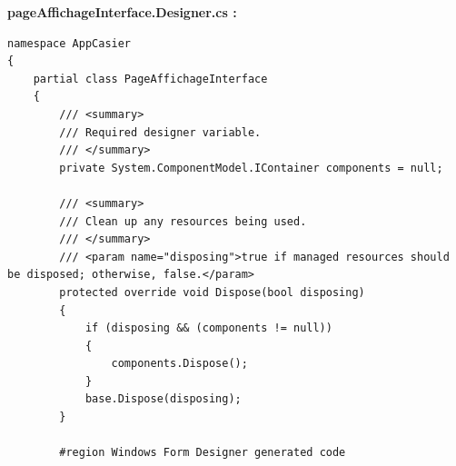 \documentclass[main.tex]{subfiles}
\begin{document}
\textbf{pageAffichageInterface.Designer.cs :}

\begin{lstlisting}
namespace AppCasier
{
    partial class PageAffichageInterface
    {
        /// <summary>
        /// Required designer variable.
        /// </summary>
        private System.ComponentModel.IContainer components = null;

        /// <summary>
        /// Clean up any resources being used.
        /// </summary>
        /// <param name="disposing">true if managed resources should be disposed; otherwise, false.</param>
        protected override void Dispose(bool disposing)
        {
            if (disposing && (components != null))
            {
                components.Dispose();
            }
            base.Dispose(disposing);
        }

        #region Windows Form Designer generated code


\end{lstlisting}
\end{document}
